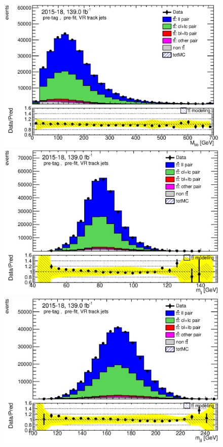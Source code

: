 \documentclass[letterpaper,12pt]{article}
\begin{document}
	\newpage
	\begin{figure}[H]
	\begin{minipage}[b]{.45\textwidth}
	\centering
	\includegraphics[width=1\textwidth]{Oct_distributions/pretagNoRwDL1rwithhighpTVRJets_scaledall/DataMC_Mbb.eps}
	\end{minipage}\hfill
	\begin{minipage}[b]{.45\textwidth}
	\centering
	\includegraphics[width=1\textwidth]{Oct_distributions/pretagNoRwDL1rwithhighpTVRJets_scaledall/DataMC_mjj.eps}
	\end{minipage}
	\begin{minipage}[b]{.45\textwidth}
	\centering
	\includegraphics[width=1\textwidth]{Oct_distributions/pretagNoRwDL1rwithhighpTVRJets_scaledall/DataMC_mjjj.eps}

\end{minipage}
\end{figure}
\end{document}

